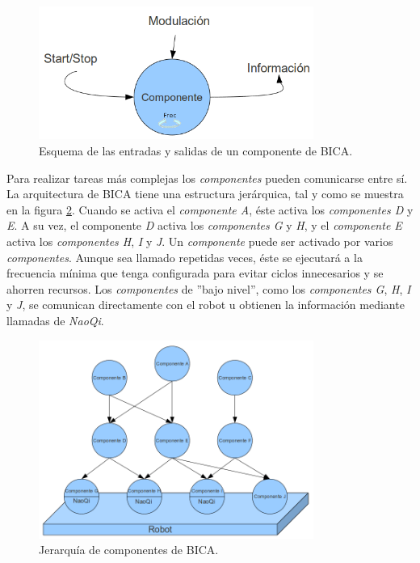 \begin{figure} [hbtp]
  \begin{center}
    \includegraphics[width=9cm]{img/cap3/componente-bica}
  \end{center}
  \caption{Esquema de las entradas y salidas de un componente de BICA.}
  \label{fig:componente-bica}
\end{figure}

Para realizar tareas más complejas los \textit{componentes} pueden comunicarse entre sí. La arquitectura de BICA tiene una estructura jerárquica, tal y como se muestra en la figura \ref{fig:componentes-bica}. Cuando se activa el \textit{componente A}, éste activa los \textit{componentes D} y \textit{E}. A su vez, el componente \textit{D} activa los \textit{componentes G} y \textit{H}, y el \textit{componente E} activa los \textit{componentes H}, \textit{I} y \textit{J}. Un \textit{componente} puede ser activado por varios \textit{componentes}. Aunque sea llamado repetidas veces, éste se ejecutará a la frecuencia mínima que tenga configurada para evitar ciclos innecesarios y se ahorren recursos. Los \textit{componentes} de ''bajo nivel'', como los \textit{componentes G}, \textit{H}, \textit{I} y \textit{J}, se comunican directamente con el robot u obtienen la información mediante llamadas de \textit{NaoQi}.\\

\begin{figure} [hbtp]
  \begin{center}
    \includegraphics[width=9cm]{img/cap3/componentes-bica}
  \end{center}
  \caption{Jerarquía de componentes de BICA.}
  \label{fig:componentes-bica}
\end{figure}


